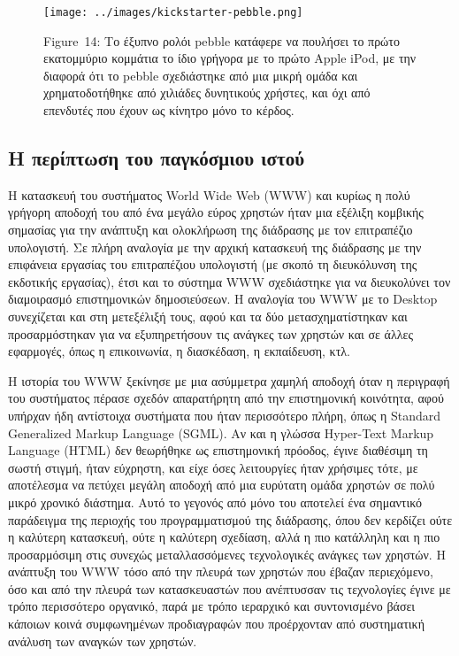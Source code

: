 \documentclass[
]{article}
\begin{document}
\leavevmode{}%
\begin{figure}
\hypertarget{fig:kickstarter-pebble}{%
\centering
\texttt{[image: ../images/kickstarter-pebble.png]}
\caption{Figure~14: Το έξυπνο ρολόι pebble κατάφερε να πουλήσει το πρώτο
εκατομμύριο κομμάτια το ίδιο γρήγορα με το πρώτο Apple iPod, με την
διαφορά ότι το pebble σχεδιάστηκε από μια μικρή ομάδα και
χρηματοδοτήθηκε από χιλιάδες δυνητικούς χρήστες, και όχι από επενδυτές
που έχουν ως κίνητρο μόνο το κέρδος.}\label{fig:kickstarter-pebble}
}
\end{figure}

\hypertarget{ux3b7-ux3c0ux3b5ux3c1ux3afux3c0ux3c4ux3c9ux3c3ux3b7-ux3c4ux3bfux3c5-ux3c0ux3b1ux3b3ux3baux3ccux3c3ux3bcux3b9ux3bfux3c5-ux3b9ux3c3ux3c4ux3bfux3cd}{%
\subsection{Η περίπτωση του παγκόσμιου
ιστού}\label{ux3b7-ux3c0ux3b5ux3c1ux3afux3c0ux3c4ux3c9ux3c3ux3b7-ux3c4ux3bfux3c5-ux3c0ux3b1ux3b3ux3baux3ccux3c3ux3bcux3b9ux3bfux3c5-ux3b9ux3c3ux3c4ux3bfux3cd}}

Η κατασκευή του συστήματος World Wide Web (WWW) και κυρίως η πολύ
γρήγορη αποδοχή του από ένα μεγάλο εύρος χρηστών ήταν μια εξέλιξη
κομβικής σημασίας για την ανάπτυξη και ολοκλήρωση της διάδρασης με τον
επιτραπέζιο υπολογιστή. Σε πλήρη αναλογία με την αρχική κατασκευή της
διάδρασης με την επιφάνεια εργασίας του επιτραπέζιου υπολογιστή (με
σκοπό τη διευκόλυνση της εκδοτικής εργασίας), έτσι και το σύστημα WWW
σχεδιάστηκε για να διευκολύνει τον διαμοιρασμό επιστημονικών
δημοσιεύσεων. Η αναλογία του WWW με το Desktop συνεχίζεται και στη
μετεξέλιξή τους, αφού και τα δύο μετασχηματίστηκαν και προσαρμόστηκαν
για να εξυπηρετήσουν τις ανάγκες των χρηστών και σε άλλες εφαρμογές,
όπως η επικοινωνία, η διασκέδαση, η εκπαίδευση, κτλ.

Η ιστορία του WWW ξεκίνησε με μια ασύμμετρα χαμηλή αποδοχή όταν η
περιγραφή του συστήματος πέρασε σχεδόν απαρατήρητη από την επιστημονική
κοινότητα, αφού υπήρχαν ήδη αντίστοιχα συστήματα που ήταν περισσότερο
πλήρη, όπως η Standard Generalized Markup Language (SGML). Αν και η
γλώσσα Hyper-Text Markup Language (HTML) δεν θεωρήθηκε ως επιστημονική
πρόοδος, έγινε διαθέσιμη τη σωστή στιγμή, ήταν εύχρηστη, και είχε όσες
λειτουργίες ήταν χρήσιμες τότε, με αποτέλεσμα να πετύχει μεγάλη αποδοχή
από μια ευρύτατη ομάδα χρηστών σε πολύ μικρό χρονικό διάστημα. Αυτό το
γεγονός από μόνο του αποτελεί ένα σημαντικό παράδειγμα της περιοχής του
προγραμματισμού της διάδρασης, όπου δεν κερδίζει ούτε η καλύτερη
κατασκευή, ούτε η καλύτερη σχεδίαση, αλλά η πιο κατάλληλη και η πιο
προσαρμόσιμη στις συνεχώς μεταλλασσόμενες τεχνολογικές ανάγκες των
χρηστών. Η ανάπτυξη του WWW τόσο από την πλευρά των χρηστών που έβαζαν
περιεχόμενο, όσο και από την πλευρά των κατασκευαστών που ανέπτυσσαν τις
τεχνολογίες έγινε με τρόπο περισσότερο οργανικό, παρά με τρόπο ιεραρχικό
και συντονισμένο βάσει κάποιων κοινά συμφωνημένων προδιαγραφών που
προέρχονταν από συστηματική ανάλυση των αναγκών των χρηστών.
\end{document}
